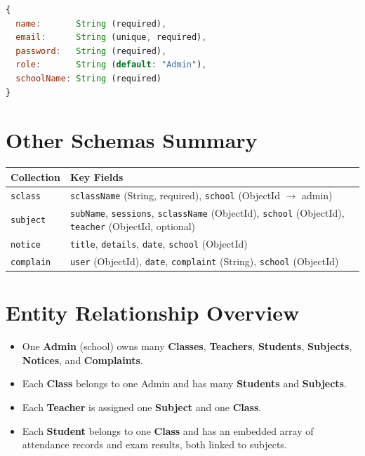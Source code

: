 \documentclass[12pt,a4paper]{report}
\begin{document}
\begin{lstlisting}[language=JavaScript, caption=adminSchema.js (summarized)]
{
  name:       String (required),
  email:      String (unique, required),
  password:   String (required),
  role:       String (default: "Admin"),
  schoolName: String (required)
}
\end{lstlisting}

\section{Other Schemas Summary}

\begin{longtable}{@{}p{3.5cm}p{11cm}@{}}
  \toprule
  \textbf{Collection} & \textbf{Key Fields} \\
  \midrule
  \endhead
  \texttt{sclass} & \texttt{sclassName} (String, required), \texttt{school} (ObjectId $\to$ admin) \\[4pt]
  \texttt{subject} & \texttt{subName}, \texttt{sessions}, \texttt{sclassName} (ObjectId), \texttt{school} (ObjectId), \texttt{teacher} (ObjectId, optional) \\[4pt]
  \texttt{notice} & \texttt{title}, \texttt{details}, \texttt{date}, \texttt{school} (ObjectId) \\[4pt]
  \texttt{complain} & \texttt{user} (ObjectId), \texttt{date}, \texttt{complaint} (String), \texttt{school} (ObjectId) \\
  \bottomrule
\end{longtable}

\section{Entity Relationship Overview}

\begin{itemize}[leftmargin=2em]
  \item One \textbf{Admin} (school) owns many \textbf{Classes}, \textbf{Teachers}, \textbf{Students}, \textbf{Subjects}, \textbf{Notices}, and \textbf{Complaints}.
  \item Each \textbf{Class} belongs to one Admin and has many \textbf{Students} and \textbf{Subjects}.
  \item Each \textbf{Teacher} is assigned one \textbf{Subject} and one \textbf{Class}.
  \item Each \textbf{Student} belongs to one \textbf{Class} and has an embedded array of attendance records and exam results, both linked to subjects.
\end{itemize}
\end{document}
